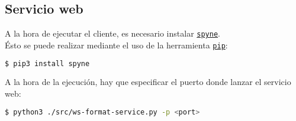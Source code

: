 \subsection{Servicio web}

A la hora de ejecutar el cliente, es necesario instalar \href{https://pypi.org/project/spyne/}{\texttt{spyne}}.\\

Ésto se puede realizar mediante el uso de la herramienta \href{https://pypi.org/project/pip/}{\texttt{pip}}:

\begin{lstlisting}[language=bash]
    $ pip3 install spyne
\end{lstlisting}

A la hora de la ejecución, hay que especificar el puerto donde lanzar el servicio web:
\begin{lstlisting}[language=bash]
    $ python3 ./src/ws-format-service.py -p <port>
\end{lstlisting}